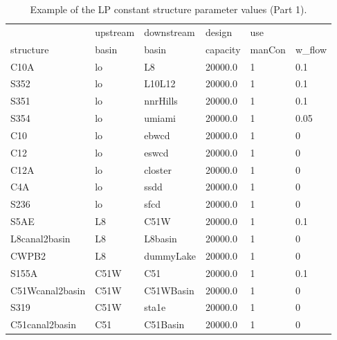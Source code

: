 \begin{table}[!htb]
 \begin{center}
  \footnotesize
  \caption{Example of the LP constant structure parameter values (Part 1). }\label{strParaConst_1}
  \begin{tabular}{p{2.5cm}p{2.5cm}p{2.5cm}p{1.8cm}p{1.5cm}p{1.5cm}}\\[0.8ex]
                   &upstream       &downstream        &design         &use     &         \\
   structure       &basin          &basin             & capacity      &manCon  & w\_flow \\
  \hline
  C10A             &lo              &L8               &20000.0        &1       &0.1 \\
  S352             &lo              &L10L12           &20000.0        &1       &0.1 \\
  S351             &lo              &nnrHills         &20000.0        &1       &0.1 \\
  S354             &lo              &umiami           &20000.0        &1       &0.05\\ 
  C10              &lo              &ebwcd            &20000.0        &1       &0   \\
  C12              &lo              &eswcd            &20000.0        &1       &0   \\
  C12A             &lo              &closter          &20000.0        &1       &0   \\
  C4A              &lo              &ssdd             &20000.0        &1       &0   \\
  S236             &lo              &sfcd             &20000.0        &1       &0   \\
  S5AE             &L8              &C51W             &20000.0        &1       &0.1 \\
  L8canal2basin    &L8              &L8basin          &20000.0        &1       &0   \\
  CWPB2            &L8              &dummyLake        &20000.0        &1       &0   \\
  S155A            &C51W            &C51              &20000.0        &1       &0.1 \\
  C51Wcanal2basin  &C51W            &C51WBasin        &20000.0        &1       &0   \\
  S319             &C51W            &sta1e            &20000.0        &1       &0   \\
  C51canal2basin   &C51             &C51Basin         &20000.0        &1       &0   \\

\end{tabular}
\end{center}
\end{table}
